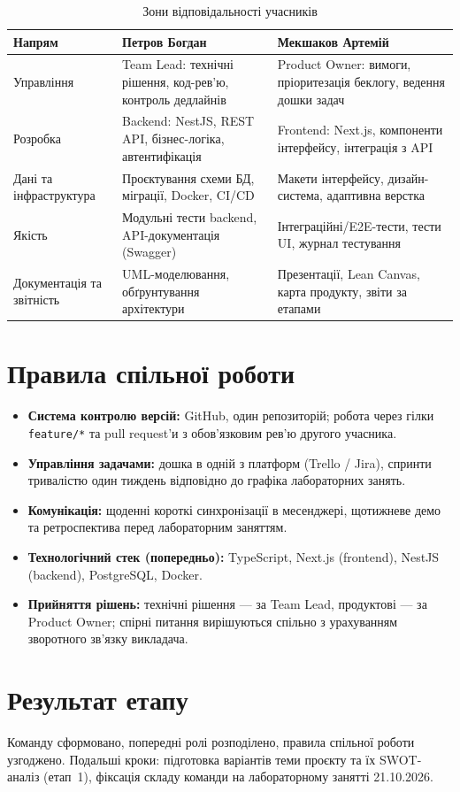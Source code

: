 \documentclass[12pt]{article}
\begin{document}
\begin{table}[h]
\centering
\renewcommand{\arraystretch}{1.3}
\begin{tabularx}{\textwidth}{L{3.6cm} Y Y}
\toprule
\textbf{Напрям} & \textbf{Петров Богдан} & \textbf{Мекшаков Артемій}\\
\midrule
Управління & Team Lead: технічні рішення, код-рев'ю, контроль дедлайнів & Product Owner: вимоги, пріоритезація беклогу, ведення дошки задач\\
\addlinespace
Розробка & Backend: NestJS, REST API, бізнес-логіка, автентифікація & Frontend: Next.js, компоненти інтерфейсу, інтеграція з API\\
\addlinespace
Дані та інфраструктура & Проєктування схеми БД, міграції, Docker, CI/CD & Макети інтерфейсу, дизайн-система, адаптивна верстка\\
\addlinespace
Якість & Модульні тести backend, API-документація (Swagger) & Інтеграційні/E2E-тести, тести UI, журнал тестування\\
\addlinespace
Документація та звітність & UML-моделювання, обґрунтування архітектури & Презентації, Lean Canvas, карта продукту, звіти за етапами\\
\bottomrule
\end{tabularx}
\caption{Зони відповідальності учасників}
\end{table}

\section{Правила спільної роботи}
\begin{itemize}[leftmargin=1.5em]
  \item \textbf{Система контролю версій:} GitHub, один репозиторій; робота через гілки \texttt{feature/*} та pull request'и з обов'язковим рев'ю другого учасника.
  \item \textbf{Управління задачами:} дошка в одній з платформ (Trello / Jira), спринти тривалістю один тиждень відповідно до графіка лабораторних занять.
  \item \textbf{Комунікація:} щоденні короткі синхронізації в месенджері, щотижневе демо та ретроспектива перед лабораторним заняттям.
  \item \textbf{Технологічний стек (попередньо):} TypeScript, Next.js (frontend), NestJS (backend), PostgreSQL, Docker.
  \item \textbf{Прийняття рішень:} технічні рішення — за Team Lead, продуктові — за Product Owner; спірні питання вирішуються спільно з урахуванням зворотного зв'язку викладача.
\end{itemize}

\section{Результат етапу}
Команду сформовано, попередні ролі розподілено, правила спільної роботи узгоджено. Подальші кроки: підготовка варіантів теми проєкту та їх SWOT-аналіз (етап~1), фіксація складу команди на лабораторному занятті 21.10.2026.
\end{document}
